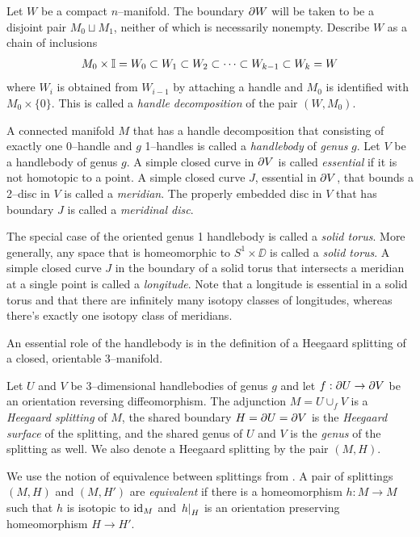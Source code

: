 \begin{defn}
	\label{def:morsehandle}
	Let $W$ be a compact $n$--manifold.
	The boundary $\partial W$ will be taken to be a disjoint pair $M_0\sqcup M_1$, neither of which is necessarily nonempty.
	Describe $W$ as a chain of inclusions
	\[
	M_0 \times\mathbb{I} = W_0 \subset W_1 \subset W_2 \subset \cdots \subset W_{k-1} \subset W_k = W
	\]
	where $W_i$ is obtained from $W_{i-1}$ by attaching a handle and $M_0$ is identified with $M_0\times \{0\}$.
	This is called a \emph{handle decomposition} of the pair $(W,M_0)$.
\end{defn}

\begin{defn}
	A connected manifold $M$ that has a handle decomposition that consisting of exactly one 0--handle and $g$ 1--handles is called a \emph{handlebody} of \emph{genus} $g$.
	Let $V$ be a handlebody of genus $g$.
	A simple closed curve in $\partial V$ is called \emph{essential} if it is not homotopic to a point.
	A simple closed curve $J$, essential in $\partial V$, that bounds a 2--disc in $V$ is called a \emph{meridian}.
	The properly embedded disc in $V$ that has boundary $J$ is called a \emph{meridinal disc}.
	
	The special case of the oriented genus 1 handlebody is called a \emph{solid torus}.
	More generally, any space that is homeomorphic to $S^1\times\DD$ is called a \emph{solid torus}.
	A simple closed curve $J$ in the boundary of a solid torus that intersects a meridian at a single point is called a \emph{longitude}.
	Note that a longitude is essential in a solid torus and that there are infinitely many isotopy classes of longitudes, whereas there's exactly one isotopy class of meridians.
\end{defn}

An essential role of the handlebody is in the definition of a Heegaard splitting of a closed, orientable 3--manifold.

\begin{defn}	
	Let $U$ and $V$ be 3--dimensional handlebodies of genus $g$ and let $f:\partial U\to \partial V$ be an orientation reversing diffeomorphism.
	The adjunction $M=U\cup_f V$ is a \emph{Heegaard splitting} of $M$, the shared boundary $H = \partial U = \partial V$ is the \emph{Heegaard surface} of the splitting, and the shared genus of $U$ and $V$ is the \emph{genus} of the splitting as well.
	We also denote a Heegaard splitting by the pair $(M,H)$.
	
	We use the notion of equivalence between splittings from \cite{SchlWald}.
	A pair of splittings $(M,H)$ and $(M,H')$ are \emph{equivalent} if there is a homeomorphism $h:M\to M$ such that $h$ is isotopic to $\textrm{id}_{M}$ and $\left.h\right|_{H}$ is an orientation preserving homeomorphism $H\to H'$.
\end{defn}

